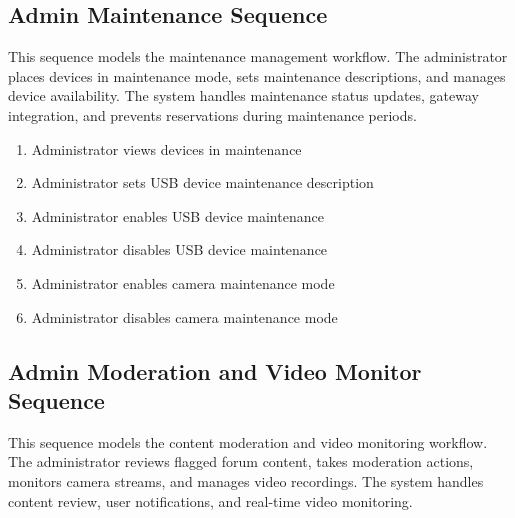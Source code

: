 
\subsection{Admin Maintenance Sequence}
This sequence models the maintenance management workflow. The administrator
places devices in maintenance mode, sets maintenance descriptions, and manages
device availability. The system handles maintenance status updates, gateway
integration, and prevents reservations during maintenance periods.

\begin{enumerate}[topsep=0pt,itemsep=1pt,parsep=0pt,partopsep=0pt]
    \item Administrator views devices in maintenance
    \item Administrator sets USB device maintenance description
    \item Administrator enables USB device maintenance
    \item Administrator disables USB device maintenance
    \item Administrator enables camera maintenance mode
    \item Administrator disables camera maintenance mode
\end{enumerate}


\subsection{Admin Moderation and Video Monitor Sequence}
This sequence models the content moderation and video monitoring workflow. The
administrator reviews flagged forum content, takes moderation actions, monitors
camera streams, and manages video recordings. The system handles content
review, user notifications, and real-time video monitoring.

